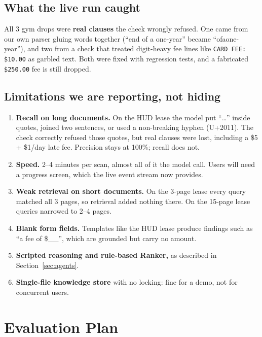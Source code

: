 \documentclass[11pt,letterpaper]{article}
\newcommand{\code}[1]{\texttt{#1}}
\begin{document}
\subsection{What the live run caught}

All 3 gym drops were \textbf{real clauses} the check wrongly refused. One came from our own parser gluing words together (``end of a one-year'' became ``ofaone-year''), and two from a check that treated digit-heavy fee lines like \code{CARD FEE: \$10.00} as garbled text. Both were fixed with regression tests, and a fabricated \code{\$250.00} fee is still dropped.

\subsection{Limitations we are reporting, not hiding}

\begin{enumerate}
  \item \textbf{Recall on long documents.} On the HUD lease the model put ``\ldots'' inside quotes, joined two sentences, or used a non-breaking hyphen (U+2011). The check correctly refused those quotes, but real clauses were lost, including a \$5 + \$1/day late fee. Precision stays at 100\%; recall does not.
  \item \textbf{Speed.} 2--4 minutes per scan, almost all of it the model call. Users will need a progress screen, which the live event stream now provides.
  \item \textbf{Weak retrieval on short documents.} On the 3-page lease every query matched all 3 pages, so retrieval added nothing there. On the 15-page lease queries narrowed to 2--4 pages.
  \item \textbf{Blank form fields.} Templates like the HUD lease produce findings such as ``a fee of \$\_\_'', which are grounded but carry no amount.
  \item \textbf{Scripted reasoning and rule-based Ranker,} as described in Section~\ref{sec:agents}.
  \item \textbf{Single-file knowledge store} with no locking: fine for a demo, not for concurrent users.
\end{enumerate}

\section{Evaluation Plan}
\end{document}
